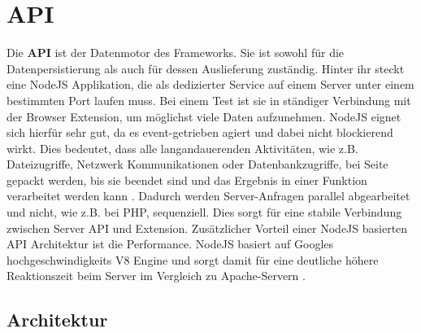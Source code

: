 %
%
%
%


\section{API}

Die \textbf{API} ist der Datenmotor des Frameworks. Sie ist sowohl für die Datenpersistierung als auch für dessen Auslieferung zuständig. Hinter ihr steckt eine NodeJS Applikation, die als dedizierter Service auf einem Server unter einem bestimmten Port laufen muss. Bei einem Test ist sie in ständiger Verbindung mit der Browser Extension, um möglichst viele Daten aufzunehmen. NodeJS eignet sich hierfür sehr gut, da es event-getrieben agiert und dabei nicht blockierend wirkt. Dies bedeutet, dass alle langandauerenden Aktivitäten, wie z.B. Dateizugriffe, Netzwerk Kommunikationen oder Datenbankzugriffe, bei Seite gepackt werden, bis sie beendet sind und das Ergebnis in einer Funktion verarbeitet werden kann \cite{nonblocking}. Dadurch werden Server-Anfragen parallel abgearbeitet und nicht, wie z.B. bei PHP, sequenziell. Dies sorgt für eine stabile Verbindung zwischen Server API und Extension. Zusätzlicher Vorteil einer NodeJS basierten API Architektur ist die Performance. NodeJS basiert auf Googles hochgeschwindigkeits V8 Engine und sorgt damit für eine deutliche höhere Reaktionszeit beim Server im Vergleich zu Apache-Servern \cite{nodevsphp}.


\subsection{Architektur}

